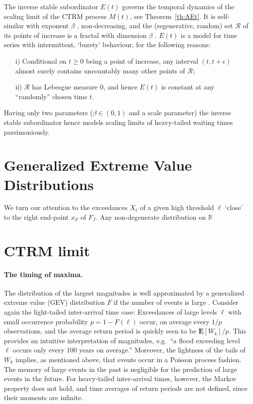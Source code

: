 \documentclass[12pt]{article}
\theoremstyle{definition}
\theoremstyle{remark}
\numberwithin{equation}{section}
\newcommand{\ex}{\mathbf {E}}
\newcommand{\R}{\mathbb R}
\newcommand{\1}{\mathbf 1}
\begin{document}
The inverse stable subordinator $E(t)$ governs the temporal dynamics of
the scaling limit of the CTRM process $M(t)$, see Theorem~\ref{th:AEt}. 
It is self-similar with exponent $\beta$
\cite{limitCTRW}, non-decreasing, and the (regenerative, random) set 
$\mathcal R$ of its points of increase is a fractal with dimension $\beta$ 
\cite{Bertoin04}.
$E(t)$ is a model for time series with intermittent, `bursty'
behaviour, for the following reasons:
\begin{itemize}
\item [i)]
Conditional on $t \ge 0$ being a point of increase, any interval 
$(t, t+ \epsilon)$ almost surely contains uncountably many other points of 
$\mathcal R$; 
\item [ii)]
$\mathcal R$ has Lebesgue measure $0$, and hence $E(t)$ is
constant at any ``randomly'' chosen time $t$. 
\end{itemize}
Having only two parameters ($\beta \in (0,1)$ and a scale parameter)
the inverse stable subordinator hence models scaling limits of heavy-tailed 
waiting times parsimoniously.

\section{Generalized Extreme Value Distributions}

We turn our attention to the exceedances $X_\ell$ of a given high threshold
$\ell$ `close' to the right end-point $x_F$ of $F_J$. 
Any non-degenerate distribution on $\R$

\section{CTRM limit}

\paragraph*{The timing of maxima.}
The distribution of the largest magnitudes is well approximated by a 
generalized extreme value (GEV) distribution $F$ if the number of events is 
large \cite{ColesBook}.
Consider again the light-tailed inter-arrival time case: 
Exceedances of large levels $\ell$ with small occurrence probability
$p = 1 - F(\ell)$ occur, on average every $1/p$ observations, and the average
return period is quickly seen to be $\ex[W_k]/p$.
This provides an intuitive interpretation of magnitudes, e.g.\ ``a flood
exceeding level $\ell$ occurs only every 100 years on average.'' 
Moreover, the lightness of the tails of $W_k$ implies, as mentioned above,
that events occur in a Poisson process fashion.  The memory of large events
in the past is negligible for the prediction of large events in the future.
For heavy-tailed inter-arrival times, however, the Markov property does not
hold, and time averages of return periods are not defined, since their moments
are infinite.  
\end{document}
